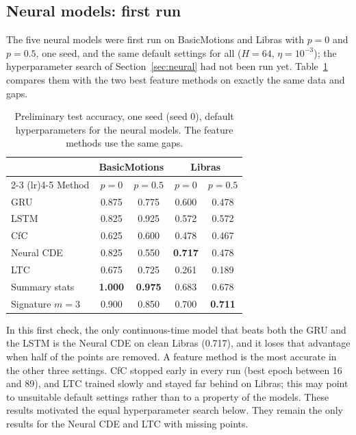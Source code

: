 \subsection{Neural models: first run}

The five neural models were first run on BasicMotions and Libras with
$p = 0$ and $p = 0.5$, one seed, and the same default settings for all
($H = 64$, $\eta = 10^{-3}$); the hyperparameter search of
Section~\ref{sec:neural} had not been run yet. Table~\ref{tab:neural}
compares them with the two best feature methods on exactly the same data
and gaps.

\begin{table}[ht]
\centering
\caption{Preliminary test accuracy, one seed (seed 0), default
hyperparameters for the neural models. The feature methods use the same
gaps.}
\label{tab:neural}
\begin{tabular}{lcccc}
\toprule
& \multicolumn{2}{c}{BasicMotions} & \multicolumn{2}{c}{Libras} \\
\cmidrule(lr){2-3} \cmidrule(lr){4-5}
Method & $p = 0$ & $p = 0.5$ & $p = 0$ & $p = 0.5$ \\
\midrule
GRU & 0.875 & 0.775 & 0.600 & 0.478 \\
LSTM & 0.825 & 0.925 & 0.572 & 0.572 \\
CfC & 0.625 & 0.600 & 0.478 & 0.467 \\
Neural CDE & 0.825 & 0.550 & \textbf{0.717} & 0.478 \\
LTC & 0.675 & 0.725 & 0.261 & 0.189 \\
\midrule
Summary stats & \textbf{1.000} & \textbf{0.975} & 0.683 & 0.678 \\
Signature $m=3$ & 0.900 & 0.850 & 0.700 & \textbf{0.711} \\
\bottomrule
\end{tabular}
\end{table}

In this first check, the only continuous-time model that beats both the
GRU and the LSTM is the Neural CDE on clean Libras (0.717), and it loses
that advantage when half of the points are removed. A feature method is
the most accurate in the other three settings. CfC stopped early in every
run (best epoch between 16 and 89), and LTC trained slowly and stayed far
behind on Libras; this may point to unsuitable default settings rather
than to a property of the models. These results motivated the equal
hyperparameter search below. They remain the only results for the Neural
CDE and LTC with missing points.

